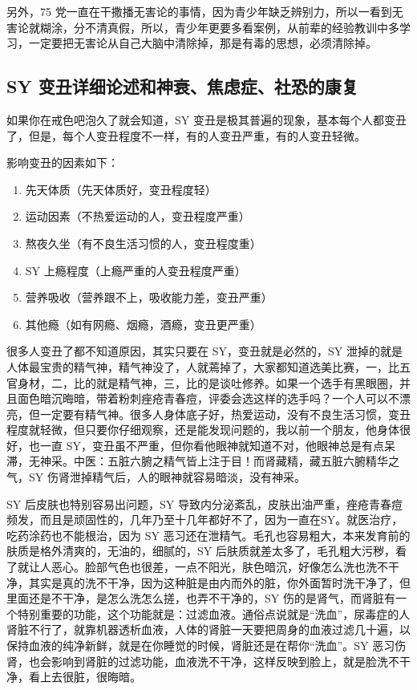 \documentclass{ctexart}
\begin{document}
另外，75 党一直在干撒播无害论的事情，因为青少年缺乏辨别力，所以一看到无害论就糊涂，分不清真假，所以，青少年更要多看案例，从前辈的经验教训中多学习，一定要把无害论从自己大脑中清除掉，那是有毒的思想，必须清除掉。

\subsection{SY 变丑详细论述和神衰、焦虑症、社恐的康复}

如果你在戒色吧泡久了就会知道，SY 变丑是极其普遍的现象，基本每个人都变丑了，但是，每个人变丑程度不一样，有的人变丑严重，有的人变丑轻微。

影响变丑的因素如下：

\begin{enumerate}
    \item 先天体质（先天体质好，变丑程度轻）
    \item 运动因素（不热爱运动的人，变丑程度严重）
    \item 熬夜久坐（有不良生活习惯的人，变丑程度重）
    \item SY 上瘾程度（上瘾严重的人变丑程度严重）
    \item 营养吸收（营养跟不上，吸收能力差，变丑严重）
    \item 其他瘾（如有网瘾、烟瘾，酒瘾，变丑更严重）
\end{enumerate}

很多人变丑了都不知道原因，其实只要在 SY，变丑就是必然的，SY 泄掉的就是人体最宝贵的精气神，精气神没了，人就蔫掉了，大家都知道选美比赛，一，比五官身材，二，比的就是精气神，三，比的是谈吐修养。如果一个选手有黑眼圈，并且面色暗沉晦暗，带着粉刺痤疮青春痘，评委会选这样的选手吗？一个人可以不漂亮，但一定要有精气神。很多人身体底子好，热爱运动，没有不良生活习惯，变丑程度就轻微，但只要你仔细观察，还是能发现问题的，我以前一个朋友，他身体很好，也一直 SY，变丑虽不严重，但你看他眼神就知道不对，他眼神总是有点呆滞，无神采。中医：五脏六腑之精气皆上注于目！而肾藏精，藏五脏六腑精华之气，SY 伤肾泄掉精气后，人的眼神就容易暗淡，没有神采。

SY 后皮肤也特别容易出问题，SY 导致内分泌紊乱，皮肤出油严重，痤疮青春痘频发，而且是顽固性的，几年乃至十几年都好不了，因为一直在SY。就医治疗，吃药涂药也不能根治，因为 SY 恶习还在泄精气。毛孔也容易粗大，本来发育前的肤质是格外清爽的，无油的，细腻的，SY 后肤质就差太多了，毛孔粗大污秽，看了就让人恶心。脸部气色也很差，一点不阳光，肤色暗沉，好像怎么洗也洗不干净，其实是真的洗不干净，因为这种脏是由内而外的脏，你外面暂时洗干净了，但里面还是不干净，是怎么洗怎么搓，也弄不干净的，SY 伤的是肾气，而肾脏有一个特别重要的功能，这个功能就是：过滤血液。通俗点说就是“洗血”，尿毒症的人肾脏不行了，就靠机器透析血液，人体的肾脏一天要把周身的血液过滤几十遍，以保持血液的纯净新鲜，就是在你睡觉的时候，肾脏还是在帮你“洗血”。SY 恶习伤肾，也会影响到肾脏的过滤功能，血液洗不干净，这样反映到脸上，就是脸洗不干净，看上去很脏，很晦暗。
\end{document}
